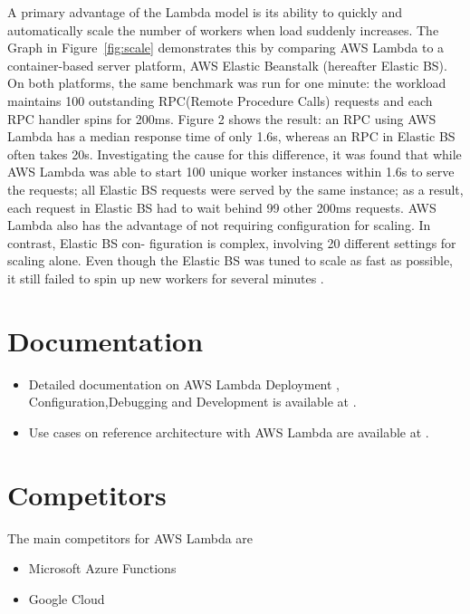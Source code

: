 \documentclass[9pt,twocolumn,twoside]{../../styles/osajnl}
\begin{document}
A primary advantage of the Lambda model is its ability
to quickly and automatically scale the number of workers
when load suddenly increases. The Graph in Figure~\ref{fig:scale} demonstrates this by 
comparing AWS Lambda to a container-based server platform,
AWS Elastic Beanstalk \cite{www-AWSEBS} (hereafter Elastic BS).
On both platforms, the same benchmark was run for one
minute: the workload maintains 100 outstanding RPC(Remote Procedure Calls)
requests and each RPC handler spins for 200ms.
Figure 2 shows the result: an RPC using AWS Lambda
has a median response time of only 1.6s, whereas an RPC
in Elastic BS often takes 20s. Investigating the cause for
this difference, it was found that while AWS Lambda was
able to start 100 unique worker instances within 1.6s to
serve the requests; all Elastic BS requests were served by
the same instance; as a result, each request in Elastic BS
had to wait behind 99 other 200ms requests.
AWS Lambda also has the advantage of not requiring
configuration for scaling. In contrast, Elastic BS con-
figuration is complex, involving 20 different settings for
scaling alone. Even though the Elastic BS was tuned to scale
as fast as possible, it still
failed to spin up new workers for several minutes  \cite{OpenLambda}.

\section{Documentation}

\begin{itemize}
\renewcommand{\labelitemi}{\scriptsize$\bullet$} 
\item Detailed documentation on AWS Lambda  Deployment , 
Configuration,Debugging and Development is available at \cite{www-AWSLambdaDoc}.
\item Use cases on reference architecture with  AWS Lambda are available at 
\cite{www-AWSLambdaUseCase}. 
\end{itemize}

\section{Competitors}

The main competitors for AWS Lambda are
\begin{itemize}
\renewcommand{\labelitemi}{\scriptsize$\bullet$} 
\item Microsoft Azure Functions
\item Google Cloud
\end{itemize}
\end{document}
